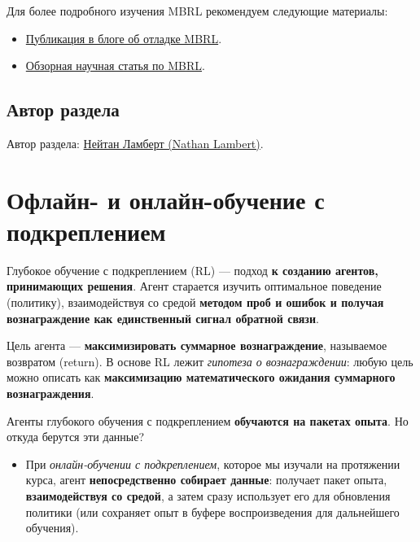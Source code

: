 \documentclass[11pt,a4paper]{article}
\begin{document}
Для более подробного изучения MBRL рекомендуем следующие материалы:

\begin{itemize}
\item
  \href{https://www.natolambert.com/writing/debugging-mbrl}{Публикация в блоге об отладке MBRL}.
\item
  \href{https://arxiv.org/abs/2006.16712}{Обзорная научная статья по MBRL}.
\end{itemize}

\subsection{Автор раздела}\label{author-1}

Автор раздела: \href{https://twitter.com/natolambert}{Нейтан Ламберт (Nathan Lambert)}.

\section{Офлайн- и онлайн-обучение с подкреплением}\label{offline-vs.-online-reinforcement-learning}

Глубокое обучение с подкреплением (RL) --- подход \textbf{к созданию агентов, принимающих решения}. Агент старается изучить оптимальное поведение (политику), взаимодействуя со средой \textbf{методом проб и ошибок и получая вознаграждение как единственный сигнал обратной связи}.

Цель агента --- \textbf{максимизировать суммарное вознаграждение}, называемое возвратом (return). В основе RL лежит \emph{гипотеза о вознаграждении}: любую цель можно описать как \textbf{максимизацию математического ожидания суммарного вознаграждения}.

Агенты глубокого обучения с подкреплением \textbf{обучаются на пакетах опыта}. Но откуда берутся эти данные?


\begin{itemize}
\tightlist
\item
  При \emph{онлайн-обучении с подкреплением}, которое мы изучали на протяжении курса, агент \textbf{непосредственно собирает данные}: получает пакет опыта, \textbf{взаимодействуя со средой}, а затем сразу использует его для обновления политики (или сохраняет опыт в буфере воспроизведения для дальнейшего обучения).
\end{itemize}
\end{document}
